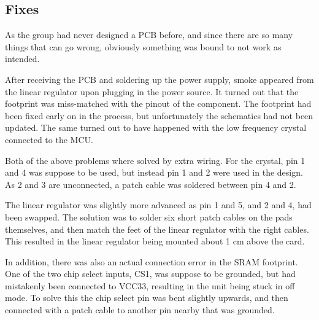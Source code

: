 
\subsection{Fixes}

As the group had never designed a PCB before, and since there
are so many things that can go wrong, obviously something was
bound to not work as intended.

After receiving the PCB and soldering up the power supply, smoke
appeared from the linear regulator upon plugging in the power
source. It turned out that the footprint was miss-matched with
the pinout of the component. The footprint had been fixed early
on in the process, but unfortunately the schematics had not been
updated. The same turned out to have happened with the low
frequency crystal connected to the MCU.

Both of the above problems where solved by extra wiring. For the
crystal, pin 1 and 4 was suppose to be used, but instead pin 1
and 2 were used in the design. As 2 and 3 are unconnected, a
patch cable was soldered between pin 4 and 2.

The linear regulator was slightly more advanced as pin 1 and 5,
and 2 and 4, had been swapped. The solution was to solder six
short patch cables on the pads themselves, and then match the
feet of the linear regulator with the right cables. This
resulted in the linear regulator being mounted about 1 cm above
the card. 

In addition, there was also an actual connection error in the
SRAM footprint. One of the two chip select inputs, CS1, was
suppose to be grounded, but had mistakenly been connected to
VCC33, resulting in the unit being stuck in off mode. To solve
this the chip select pin was bent slightly upwards, and then
connected with a patch cable to another pin nearby that was
grounded. 
